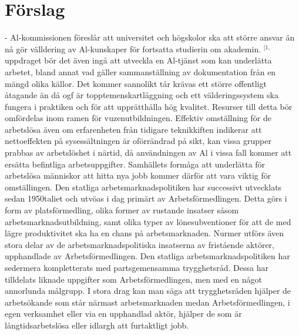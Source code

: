 {\section*{Förslag}
- Al-kommissionen föreslår att universitet och högskolor ska att större ansvar än nå gör välldering av Al-kunskaper för fortsatta studierin om akademin. \({ }^{[1,}\) uppdraget bör det även ingå att utveckla en Al-tjänst som kan underlätta arbetet, bland annat vad gäller sammanställning av dokumentation från en mängd olika källor. Det kommer sannolikt tår krävas ett större offentligt åtagande än då ogf är topptemenskartlåggning och ett välderingssystem ska fungera i praktiken och för att upprätthålla hög kvalitet. Resurser till detta bör omfördelas inom ramen för vuzenutbildningen.
Effektiv omställning för de arbetslösa även om erfarenheten från tidigare teknikkiften indikerar att nettoeffekten på sysessältningen är oförrändrad på sikt, kan vissa grupper prabbas av arbetslöshet i närtid, då användningen av Al i vissa fall kommer att ersätta befintliga arbetsuppgifter. Samhällets formåga att underlätta för arbetslösa människor att hitta nya jobb kommer därför att vara viktig för omställingen. Den statliga arbetsmarknadspolitiken har successivt utvecklats sedan 1950taliet och utvöas i dag primärt av Arbetsförmedlingen. Detta görs i form av platsförmedling, olika former av rustande insatser såsom arbetsmarknadsutbildning, samt olika typer av lönesubventioner för att de med lägre produktivitet ska ha en chans på arbetsmarknaden.
Nurmer utförs även stora delar av de arbetsmarknadspolitiska insatserna av fristående aktörer, upphandlade av Arbetsförmedlingen. Den statliga arbetsmarknadspolitiken har sedermera kompletterats med partsgemensamma trygghetsråd. Dessa har tilldelats liknade uppgifter som Arbetsförmedlingen, men med en något annorlunda målgrupp. I stora drag kan man säga att trygghetsråden hjälper de arbetsökande som står närmast arbetsmarknaden medan Arbetsförmedlingen, i egen verksamhet eller via en upphandlad aktör, hjälper de som är långtidsarbetslösa eller idlargh att furtaktligt jobb.
}
